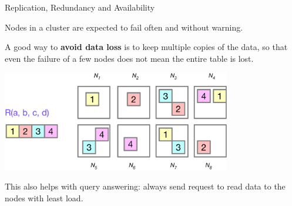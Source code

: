 %
%

\begin{frame}{Replication, Redundancy and Availability}

Nodes in a cluster are \alert{expected to fail} often and without warning. 

A good way to \textbf{avoid data loss} is to keep multiple copies of the data, so that even the failure of a few nodes does not mean the entire table is lost.

\begin{center}
\includegraphics[width=0.75\textwidth]{figures/partitioned_table_redundancy.eps}
\end{center}

This also helps with query answering: always send request to read data to the nodes with least load.

\end{frame}


%
%


